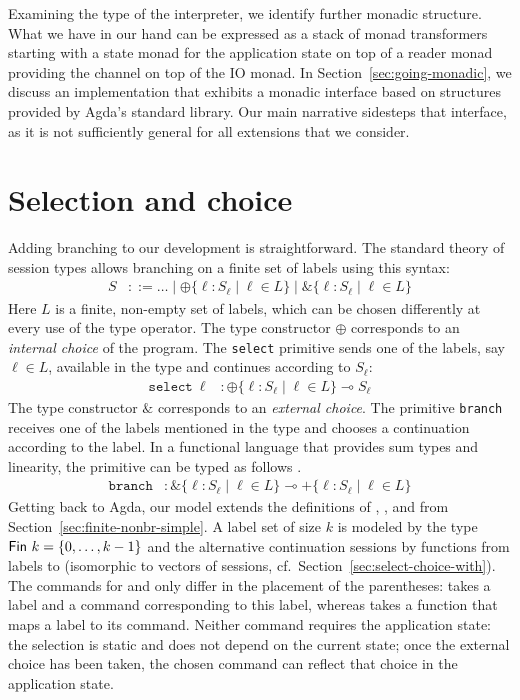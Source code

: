 \documentclass[acmsmall,review,anonymous,screen]{acmart}
\begin{document}
Examining the type of the interpreter, we identify further monadic
structure. What we have in our hand can be expressed as a stack of monad transformers starting with a state
monad for the application state on top of a reader monad providing the
channel on top of the IO monad. In Section~\ref{sec:going-monadic},
we discuss an implementation that exhibits a monadic interface based
on structures provided by Agda's standard library.
Our main narrative sidesteps that interface, as it is not sufficiently
general for all extensions that we consider.

\section{Selection and choice}
\label{sec:select-choice}

Adding branching to our development is straightforward. The standard 
theory of session types allows branching on a finite set of labels using this syntax:
\begin{align*}
  S & ::= \dots \mid \oplus\{ \ell : S_\ell \mid \ell \in L \} \mid
      \&\{\ell: S_\ell \mid \ell \in L\}
\end{align*}
Here $L$ is a finite, non-empty set of labels, which can be chosen differently at
every use of the type operator. 
The type constructor $\oplus$ corresponds to an \emph{internal choice} of the
program.  The \texttt{select} primitive sends one of the labels, say $\ell \in L$, available in the
type and continues according to $S_\ell$:
\begin{align*}
  \mathtt{select}\ \ell &: \oplus\{ \ell : S_\ell \mid \ell \in L \}
                          \multimap S_\ell
\end{align*}
The type constructor $\&$ corresponds to an \emph{external choice}. The
primitive \texttt{branch} receives one of the labels 
mentioned in the type and chooses a continuation according to the
label. In a functional language that provides sum types and linearity,
the primitive can be typed as follows \cite{DBLP:journals/toplas/Padovani19}.
\begin{align*}
  \mathtt{branch} &: \&\{\ell: S_\ell \mid \ell \in L\} \multimap +\{\ell: S_\ell \mid \ell \in L\}
\end{align*}
Getting back to Agda, our model extends the definitions of
{\ASession}, {\ACommand}, and {\Aexecutor} from
Section~\ref{sec:finite-nonbr-simple}. A label set of size $k$ is
modeled by the type $\AFin~k = \{ 0, \dots, k-1\}$ and the alternative continuation sessions by
functions from labels to {\ASession} (isomorphic to vectors of sessions, cf.\  Section~\ref{sec:select-choice-with}).
\stBranchingType
\stBranchingCommand
The commands for {\ACSELECT} and {\ACCHOICE} only differ in the
placement of the parentheses: {\ACSELECT} takes a label and a command
corresponding to this label, whereas {\ACCHOICE} takes a function that
maps a label to its command. Neither command requires the application
state: the selection is static and does not depend on the current
state; once the external choice has been taken, the chosen command can
reflect that choice in the application state.
\stExecutorSignature\vspace{-1.5\baselineskip}
\stBranchingExecutor
\end{document}
